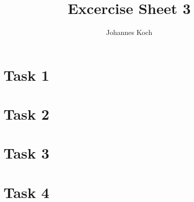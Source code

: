 \documentclass[11pt]{article} %
\title{Excercise Sheet 3}
\author{Johannes Koch}
\begin{document}
\maketitle

\section{Task 1}

\clearpage

\section{Task 2}

\clearpage

\section{Task 3}

\clearpage

\section{Task 4}

\end{document}
